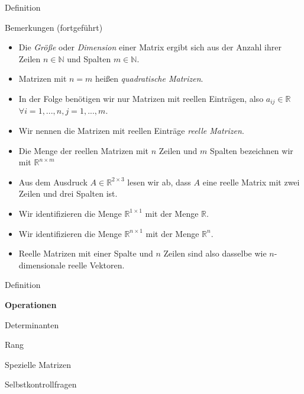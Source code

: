 \documentclass[
  8pt,
  ignorenonframetext,
]{beamer}
\providecommand{\tightlist}{%
  \setlength{\itemsep}{0pt}\setlength{\parskip}{0pt}}
\begin{document}
\begin{frame}{Definition}
\protect\hypertarget{definition-2}{}
\small

Bemerkungen (fortgeführt)

\footnotesize

\begin{itemize}
\tightlist
\item
  Die \emph{Größe} oder \emph{Dimension} einer Matrix ergibt sich aus
  der Anzahl ihrer Zeilen \(n \in \mathbb{N}\) und Spalten
  \(m \in \mathbb{N}\).
\item
  Matrizen mit \(n = m\) heißen \emph{quadratische Matrizen}.
\item
  In der Folge benötigen wir nur Matrizen mit reellen Einträgen, also
  \(a_{ij} \in \mathbb{R}\) \(\forall i = 1,...,n, j = 1,...,m\).
\item
  Wir nennen die Matrizen mit reellen Einträge \emph{reelle Matrizen}.
\item
  Die Menge der reellen Matrizen mit \(n\) Zeilen und \(m\) Spalten
  bezeichnen wir mit \(\mathbb{R}^{n \times m}\)
\item
  Aus dem Ausdruck \(A \in \mathbb{R}^{2\times3}\) lesen wir ab, dass
  \(A\) eine reelle Matrix mit zwei Zeilen und drei Spalten ist.
\item
  Wir identifizieren die Menge \(\mathbb{R}^{1 \times 1}\) mit der Menge
  \(\mathbb{R}\).
\item
  Wir identifizieren die Menge \(\mathbb{R}^{n \times 1}\) mit der Menge
  \(\mathbb{R}^n\).
\item
  Reelle Matrizen mit einer Spalte und \(n\) Zeilen sind also dasselbe
  wie \(n\)-dimensionale reelle Vektoren.
\end{itemize}
\end{frame}

\begin{frame}{}
\protect\hypertarget{section-4}{}
\large
{}
\vfill

Definition

\textbf{Operationen}

Determinanten

Rang

Spezielle Matrizen

Selbstkontrollfragen \vfill
\end{frame}
\end{document}
